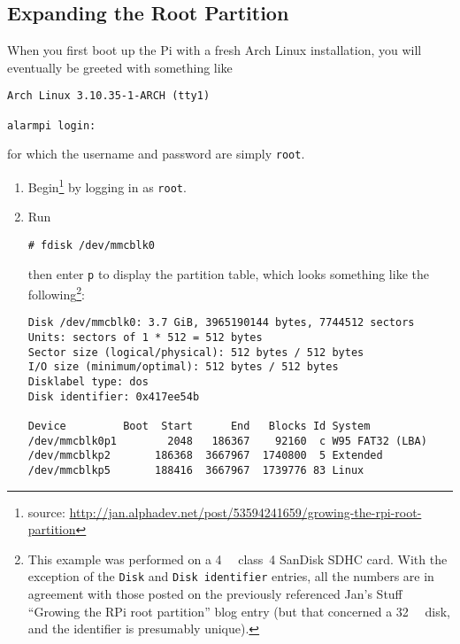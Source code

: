\documentclass[12pt,letterpaper]{article}
\begin{document}

\subsection{Expanding the Root Partition}

When you first boot up the Pi with a fresh Arch Linux installation, you will eventually be greeted with something like

\begin{lstlisting}
Arch Linux 3.10.35-1-ARCH (tty1)

alarmpi login:
\end{lstlisting}
for which the username and password are simply \lstinline{root}.

\begin{enumerate}
\item Begin\footnote{%
source:
\url{http://jan.alphadev.net/post/53594241659/growing-the-rpi-root-partition}} by logging in as \lstinline{root}.

\item Run
\begin{lstlisting}
# fdisk /dev/mmcblk0
\end{lstlisting}
then enter \lstinline{p} to display the partition table, which looks something like the following\footnote{This example was performed on a \SI{4}{\giga\byte} class~4 SanDisk SDHC card.  With the exception of the \lstinline{Disk} and \lstinline{Disk identifier} entries, all the numbers are in agreement with those posted on the previously referenced Jan's Stuff ``Growing the RPi root partition'' blog entry (but that concerned a \SI{32}{\giga\byte} disk, and the identifier is presumably unique).}:


\begin{lstlisting}[basicstyle=\ttfamily\footnotesize]
Disk /dev/mmcblk0: 3.7 GiB, 3965190144 bytes, 7744512 sectors
Units: sectors of 1 * 512 = 512 bytes
Sector size (logical/physical): 512 bytes / 512 bytes
I/O size (minimum/optimal): 512 bytes / 512 bytes
Disklabel type: dos
Disk identifier: 0x417ee54b

Device         Boot  Start      End   Blocks Id System
/dev/mmcblk0p1        2048   186367    92160  c W95 FAT32 (LBA)
/dev/mmcblkp2       186368  3667967  1740800  5 Extended
/dev/mmcblkp5       188416  3667967  1739776 83 Linux
\end{lstlisting}


\end{enumerate}
\end{document}
